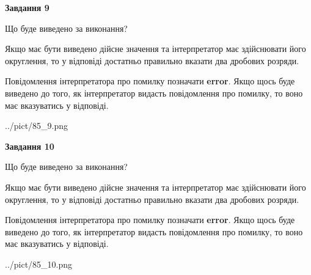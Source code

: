 \documentclass[12pt, ukrainian]{article}
\begin{document}
{\begin {Large}
{\begin {center}\textbf{Завдання 9}\end {center}}\par
Що буде виведено за виконання? \par

Якщо має бути виведено дійсне значення та інтерпретатор має здійснювати його округлення, 
то у відповіді достатньо правильно вказати два дробових розряди.

Повідомлення інтерпретатора про помилку позначати \textbf{error}.
Якщо щось буде виведено до того, як інтерпретатор видасть повідомлення про помилку, 
то воно має вказуватись у відповіді. \par

\begin{center}
	{../pict/85_9.png}
\end{center}
\newpage

{\begin {center}\textbf{Завдання 10}\end {center}}\par
Що буде виведено за виконання? \par

Якщо має бути виведено дійсне значення та інтерпретатор має здійснювати його округлення, 
то у відповіді достатньо правильно вказати два дробових розряди.

Повідомлення інтерпретатора про помилку позначати \textbf{error}.
Якщо щось буде виведено до того, як інтерпретатор видасть повідомлення про помилку, 
то воно має вказуватись у відповіді. \par

\begin{center}
	{../pict/85_10.png}
\end{center}
\newpage

\end {Large}}
\end{document}
